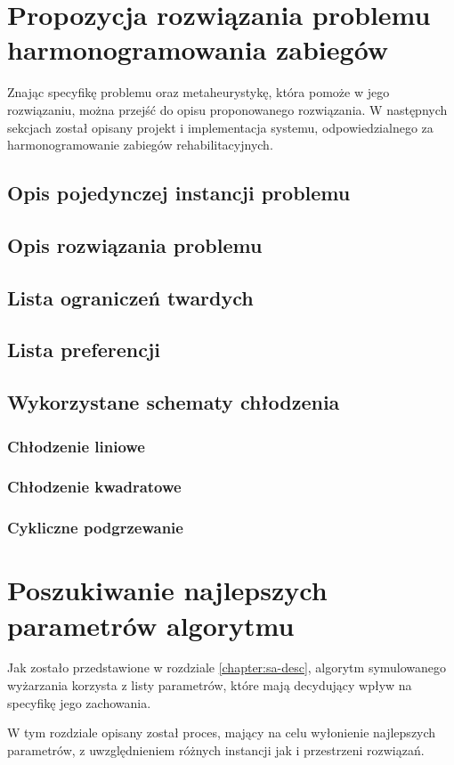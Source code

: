 \chapter{Propozycja rozwiązania problemu harmonogramowania zabiegów}
Znając specyfikę problemu oraz metaheurystykę, która pomoże w jego rozwiązaniu,
można przejść do opisu proponowanego rozwiązania. W następnych sekcjach został 
opisany projekt i implementacja systemu, odpowiedzialnego za harmonogramowanie zabiegów rehabilitacyjnych.

\section{Opis pojedynczej instancji problemu}
\section{Opis rozwiązania problemu}
\section{Lista ograniczeń twardych}
\section{Lista preferencji}
\section{Wykorzystane schematy chłodzenia}
\subsection{Chłodzenie liniowe}
\subsection{Chłodzenie kwadratowe}
\subsection{Cykliczne podgrzewanie}


\chapter{Poszukiwanie najlepszych parametrów algorytmu}
Jak zostało przedstawione w rozdziale \ref{chapter:sa-desc}, algorytm
symulowanego wyżarzania korzysta z listy parametrów, które mają decydujący wpływ
na specyfikę jego zachowania. 

W tym rozdziale opisany został proces, mający na celu wyłonienie najlepszych
parametrów, z uwzględnieniem różnych instancji jak i przestrzeni rozwiązań.

